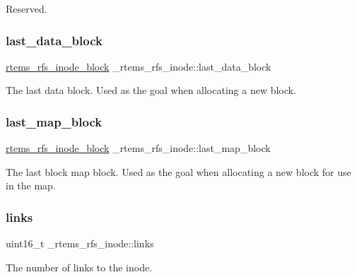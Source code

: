 Reserved. \mbox{\label{struct__rtems__rfs__inode_ac9a7ef1f60dd6a35f6e70801c0e46068}} 
\subsubsection{\texorpdfstring{last\_data\_block}{last\_data\_block}}
{\footnotesize\ttfamily \mbox{\hyperlink{rtems-rfs-inode_8h_aa30717f37e5238a8f6387b4d0dbb2ae3}{rtems\+\_\+rfs\+\_\+inode\+\_\+block}} \+\_\+rtems\+\_\+rfs\+\_\+inode\+::last\+\_\+data\+\_\+block}

The last data block. Used as the goal when allocating a new block. \mbox{\label{struct__rtems__rfs__inode_a8fd9bd3c81ca28edf46281a14bb71200}} 
\subsubsection{\texorpdfstring{last\_map\_block}{last\_map\_block}}
{\footnotesize\ttfamily \mbox{\hyperlink{rtems-rfs-inode_8h_aa30717f37e5238a8f6387b4d0dbb2ae3}{rtems\+\_\+rfs\+\_\+inode\+\_\+block}} \+\_\+rtems\+\_\+rfs\+\_\+inode\+::last\+\_\+map\+\_\+block}

The last block map block. Used as the goal when allocating a new block for use in the map. \mbox{\label{struct__rtems__rfs__inode_a878b5263e3f521283af79db51e995b5d}} 
\subsubsection{\texorpdfstring{links}{links}}
{\footnotesize\ttfamily uint16\+\_\+t \+\_\+rtems\+\_\+rfs\+\_\+inode\+::links}

The number of links to the inode. \mbox{\label{struct__rtems__rfs__inode_a3fa86fbf98f359014ff1c6a1bfa21fb8}} 
